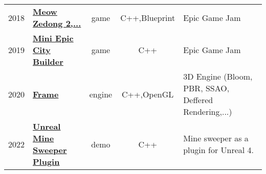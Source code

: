 \documentclass[a4paper]{deedy-resume} %
\begin{document}
\begin{tabular}{rlccl}
2018 & \textbf{\href{https://www.epicgamejam.com/games/meow-zedong-great-helmsman-future-chairman-urinal-leap-forward}{Meow Zedong 2,...}} & 
	game & C++,Blueprint & Epic Game Jam \\
2019 & \textbf{\href{https://www.epicgamejam.com/games/mini-epic-city-builder}{Mini Epic City Builder}} &
	game & C++ & Epic Game Jam \\
2020 & \textbf{\href{https://www.github.com/anirul/Frame}{Frame}} & 
	engine & C++,OpenGL & 3D Engine (Bloom, PBR, SSAO, Deffered Rendering,...) \\
2022 & \textbf{\href{https://github.com/anirul/UnrealMineSweeperTool}{Unreal Mine Sweeper Plugin}} &
	demo & C++ & Mine sweeper as a plugin for Unreal 4.
\end{tabular}










\end{document}
